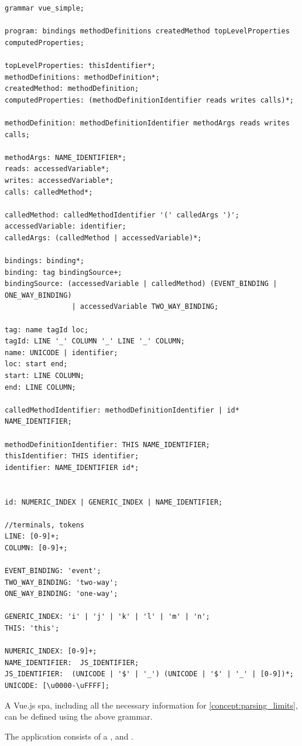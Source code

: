 \begin{lstlisting}[language=antrl]
grammar vue_simple;

program: bindings methodDefinitions createdMethod topLevelProperties computedProperties;

topLevelProperties: thisIdentifier*;
methodDefinitions: methodDefinition*; 
createdMethod: methodDefinition;
computedProperties: (methodDefinitionIdentifier reads writes calls)*;

methodDefinition: methodDefinitionIdentifier methodArgs reads writes calls;

methodArgs: NAME_IDENTIFIER*;
reads: accessedVariable*;
writes: accessedVariable*;
calls: calledMethod*;

calledMethod: calledMethodIdentifier '(' calledArgs ')';
accessedVariable: identifier;
calledArgs: (calledMethod | accessedVariable)*;

bindings: binding*;
binding: tag bindingSource+;
bindingSource: (accessedVariable | calledMethod) (EVENT_BINDING | ONE_WAY_BINDING)
                | accessedVariable TWO_WAY_BINDING;

tag: name tagId loc;
tagId: LINE '_' COLUMN '_' LINE '_' COLUMN;
name: UNICODE | identifier;
loc: start end;
start: LINE COLUMN;
end: LINE COLUMN;

calledMethodIdentifier: methodDefinitionIdentifier | id* NAME_IDENTIFIER;

methodDefinitionIdentifier: THIS NAME_IDENTIFIER;
thisIdentifier: THIS identifier;
identifier: NAME_IDENTIFIER id*;


id: NUMERIC_INDEX | GENERIC_INDEX | NAME_IDENTIFIER;

//terminals, tokens
LINE: [0-9]+;
COLUMN: [0-9]+;

EVENT_BINDING: 'event';
TWO_WAY_BINDING: 'two-way';
ONE_WAY_BINDING: 'one-way';

GENERIC_INDEX: 'i' | 'j' | 'k' | 'l' | 'm' | 'n';
THIS: 'this';

NUMERIC_INDEX: [0-9]+;
NAME_IDENTIFIER:  JS_IDENTIFIER;
JS_IDENTIFIER:  (UNICODE | '$' | '_') (UNICODE | '$' | '_' | [0-9])*;
UNICODE: [\u0000-\uFFFF];
\end{lstlisting}
\label{ast}

A Vue.js \gls{spa}, including all the necessary information for \ref{concept:parsing_limits}, can be defined using the above grammar. 

The application consists of   a ,  and . 

